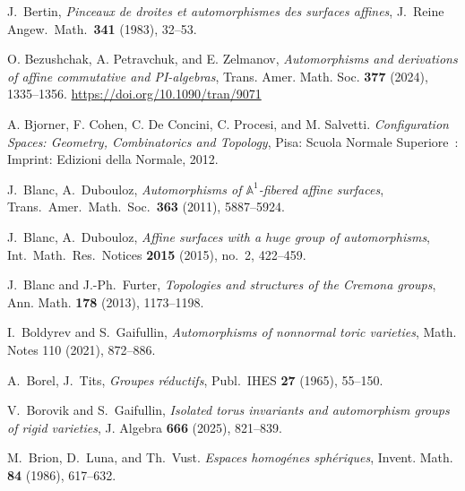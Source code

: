 J.~Bertin, \emph{Pinceaux de droites
et automorphismes des surfaces affines}, J.\ Reine Angew.\ Math.\ \textbf{341} (1983), 32--53.

O. Bezushchak, A. Petravchuk, and E. Zelmanov, \emph{Automorphisms and derivations of affine commutative and PI-algebras}, Trans. Amer. Math. Soc. \textbf{377} (2024), 1335--1356. \url{https://doi.org/10.1090/tran/9071}

A. Bjorner, F. Cohen, C. De Concini, C. Procesi, and M. Salvetti. \emph{Configuration Spaces: Geometry, Combinatorics and Topology}, Pisa: Scuola Normale Superiore~: Imprint: Edizioni della Normale, 2012.

J.~Blanc, A.~Dubouloz, \emph{Automorphisms of $\mathbb{A}^{1}$-fibered affine surfaces},
Trans.\ Amer.\ Math.\ Soc.\ \textbf{363} (2011), 5887--5924.

J.~Blanc, A.~Dubouloz, \emph{Affine surfaces with a huge group of automorphisms}, Int.\ Math.\ Res.\ Notices   \textbf{2015} (2015), no.~2, 422--459.

J.~Blanc and J.-Ph.~Furter,
\emph{Topologies and structures of the Cremona groups},
Ann. Math. \textbf{178} (2013), 1173--1198.



I.~Boldyrev and S.~Gaifullin,
\emph{Automorphisms of nonnormal toric varieties},
Math. Notes 110  (2021), 872--886.

A.~Borel, J.~Tits, \emph{Groupes r\'eductifs}, Publ.\ IHES \textbf{27} (1965), 55--150.

V.~Borovik and S.~Gaifullin,
\emph{Isolated torus invariants and
automorphism groups of rigid varieties},
J. Algebra \textbf{666} (2025), 821--839.

M.~Brion, D.~Luna, and Th.~Vust.
\emph{Espaces homog\'enes sph\'eriques}, Invent. Math. \textbf{84} (1986), 617--632.


